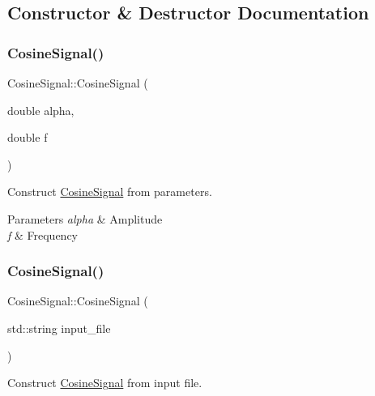 \subsection{Constructor \& Destructor Documentation}
\mbox{\label{classCosineSignal_a410237bec2f4171534e04f5a04259c98}} 
\subsubsection{\texorpdfstring{Cosine\+Signal()}{CosineSignal()}\hspace{0.1cm}{\footnotesize\ttfamily [1/2]}}
{\footnotesize\ttfamily Cosine\+Signal\+::\+Cosine\+Signal (\begin{DoxyParamCaption}\item[{double}]{alpha,  }\item[{double}]{f }\end{DoxyParamCaption})}



Construct \hyperlink{classCosineSignal}{Cosine\+Signal} from parameters. 


\begin{DoxyParams}{Parameters}
{\em alpha} & Amplitude \\
\hline
{\em f} & Frequency \\
\hline
\end{DoxyParams}
\mbox{\label{classCosineSignal_a60c5a9cc2d1ed9b8543cdf51f1a3a44a}} 
\subsubsection{\texorpdfstring{Cosine\+Signal()}{CosineSignal()}\hspace{0.1cm}{\footnotesize\ttfamily [2/2]}}
{\footnotesize\ttfamily Cosine\+Signal\+::\+Cosine\+Signal (\begin{DoxyParamCaption}\item[{std\+::string}]{input\+\_\+file }\end{DoxyParamCaption})}



Construct \hyperlink{classCosineSignal}{Cosine\+Signal} from input file. 


